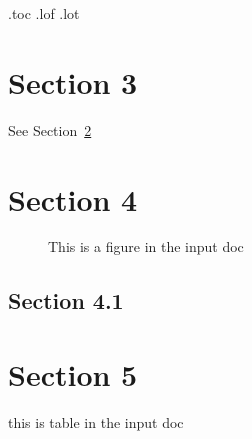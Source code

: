 \documentclass{article}
\begin{document}
\makeatletter
\newwrite\tf@toc\immediate\openout\tf@toc\jobname.toc\relax
\newwrite\tf@lof\immediate\openout\tf@lof\jobname.lof\relax
\newwrite\tf@lot\immediate\openout\tf@lot\jobname.lot\relax
\makeatother

\setcounter{section}{2} %
\setcounter{page}{3}    %

\section{Section 3}\label{sec}
See Section~\ref{sec2}\par
\kant[3-6]
\section{Section 4}\label{sec2}
\begin{figure}
   \caption[input doc figure]{This is a figure in the input doc}
\end{figure}
\subsection{Section 4.1}\label{2-1}
\kant[8]
\section{Section 5}\label{sec3}
\begin{table}
   \caption[input doc table]{this is table in the input doc}
\end{table}
\kant[9]
\end{document}
